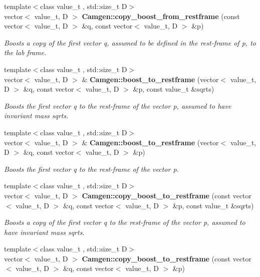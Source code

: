 \begin{DoxyCompactItemize}
{\footnotesize template$<$class value\+\_\+t , std\+::size\+\_\+t D$>$ }\\vector$<$ value\+\_\+t, D $>$ {\bfseries Camgen\+::copy\+\_\+boost\+\_\+from\+\_\+restframe} (const vector$<$ value\+\_\+t, D $>$ \&q, const vector$<$ value\+\_\+t, D $>$ \&p)
\begin{DoxyCompactList}\small\item\em Boosts a copy of the first vector q, assumed to be defined in the rest-\/frame of p, to the lab frame. \end{DoxyCompactList}\item 
{\footnotesize template$<$class value\+\_\+t , std\+::size\+\_\+t D$>$ }\\vector$<$ value\+\_\+t, D $>$ \& {\bfseries Camgen\+::boost\+\_\+to\+\_\+restframe} (vector$<$ value\+\_\+t, D $>$ \&q, const vector$<$ value\+\_\+t, D $>$ \&p, const value\+\_\+t \&sqrts)
\begin{DoxyCompactList}\small\item\em Boosts the first vector q to the rest-\/frame of the vector p, assumed to have invariant mass sqrts. \end{DoxyCompactList}\item 
\hypertarget{a00878_abb5eb6c49b5a2ff87a16dc23728e779b}{}{\footnotesize template$<$class value\+\_\+t , std\+::size\+\_\+t D$>$ }\\vector$<$ value\+\_\+t, D $>$ \& {\bfseries Camgen\+::boost\+\_\+to\+\_\+restframe} (vector$<$ value\+\_\+t, D $>$ \&q, const vector$<$ value\+\_\+t, D $>$ \&p)\label{a00878_abb5eb6c49b5a2ff87a16dc23728e779b}

\begin{DoxyCompactList}\small\item\em Boosts the first vector q to the rest-\/frame of the vector p. \end{DoxyCompactList}\item 
{\footnotesize template$<$class value\+\_\+t , std\+::size\+\_\+t D$>$ }\\vector$<$ value\+\_\+t, D $>$ {\bfseries Camgen\+::copy\+\_\+boost\+\_\+to\+\_\+restframe} (const vector$<$ value\+\_\+t, D $>$ \&q, const vector$<$ value\+\_\+t, D $>$ \&p, const value\+\_\+t \&sqrts)
\begin{DoxyCompactList}\small\item\em Boosts a copy of the first vector q to the rest-\/frame of the vector p, assumed to have invariant mass sqrts. \end{DoxyCompactList}\item 
\hypertarget{a00878_a7809ff644ef4a5fe3693137967664e99}{}{\footnotesize template$<$class value\+\_\+t , std\+::size\+\_\+t D$>$ }\\vector$<$ value\+\_\+t, D $>$ {\bfseries Camgen\+::copy\+\_\+boost\+\_\+to\+\_\+restframe} (const vector$<$ value\+\_\+t, D $>$ \&q, const vector$<$ value\+\_\+t, D $>$ \&p)\label{a00878_a7809ff644ef4a5fe3693137967664e99}


\end{DoxyCompactItemize}
